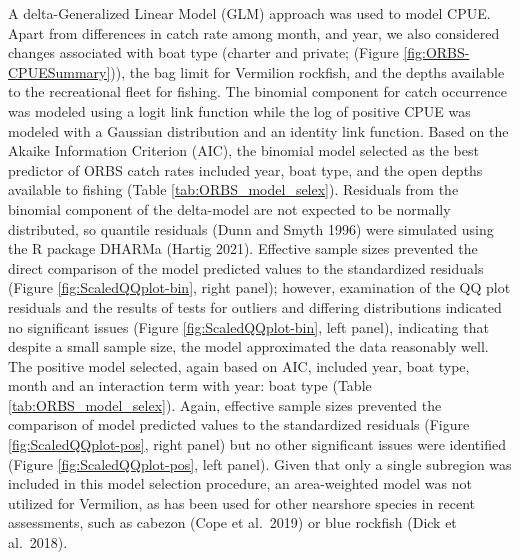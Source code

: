 \documentclass[11pt,
  english,
  a4paper,
]{article}
\begin{document}
A delta-Generalized Linear Model (GLM) approach was used to model CPUE. Apart from differences in catch rate among month, and year, we also considered changes associated with boat type (charter and private; (Figure \ref{fig:ORBS-CPUESummary})), the bag limit for Vermilion rockfish, and the depths available to the recreational fleet for fishing. The binomial component for catch occurrence was modeled using a logit link function while the log of positive CPUE was modeled with a Gaussian distribution and an identity link function. Based on the Akaike Information Criterion (AIC), the binomial model selected as the best predictor of ORBS catch rates included year, boat type, and the open depths available to fishing (Table \ref{tab:ORBS_model_selex}). Residuals from the binomial component of the delta-model are not expected to be normally distributed, so quantile residuals (Dunn and Smyth 1996) were simulated using the R package DHARMa (Hartig 2021). Effective sample sizes prevented the direct comparison of the model predicted values to the standardized residuals (Figure \ref{fig:ScaledQQplot-bin}, right panel); however, examination of the QQ plot residuals and the results of tests for outliers and differing distributions indicated no significant issues (Figure \ref{fig:ScaledQQplot-bin}, left panel), indicating that despite a small sample size, the model approximated the data reasonably well. The positive model selected, again based on AIC, included year, boat type, month and an interaction term with year: boat type (Table \ref{tab:ORBS_model_selex}). Again, effective sample sizes prevented the comparison of model predicted values to the standardized residuals (Figure \ref{fig:ScaledQQplot-pos}, right panel) but no other significant issues were identified (Figure \ref{fig:ScaledQQplot-pos}, left panel). Given that only a single subregion was included in this model selection procedure, an area-weighted model was not utilized for Vermilion, as has been used for other nearshore species in recent assessments, such as cabezon (Cope et al.~2019) or blue rockfish (Dick et al.~2018).

\leavevmode\tagmcend\tagstructend\par

\end{document}
